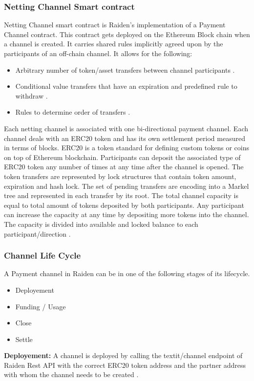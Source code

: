 \subsubsection{Netting Channel Smart contract} \label{NCSC}	
Netting Channel smart contract is Raiden’s implementation of a Payment Channel contract. This contract gets deployed on the Ethereum Block chain when a channel is created. It carries shared rules implicitly agreed upon by the participants of an off-chain channel. It allows for the following: \cite{rad:001}
\begin{itemize}

\item Arbitrary number of token/asset transfers between channel participants \cite{rad:001}.
\item Conditional value transfers that have an expiration and predefined rule to withdraw \cite{rad:001}.
\item Rules to determine order of transfers \cite{rad:001}.

\end{itemize}
Each netting channel is associated with one bi-directional payment channel. Each channel deals with an ERC20 token and has its own settlement period measured in terms of blocks. ERC20 is a token standard for defining custom tokens or coins on top of Ethereum blockchain. Participants can deposit the associated type of ERC20 token any number of times at any time after the channel is opened. The token transfers are represented by lock structures that contain token amount, expiration and hash lock. The set of pending transfers are encoding into a Markel tree and represented in each transfer by its root. The total channel capacity is equal to total amount of tokens deposited by both participants. Any participant can increase the capacity at any time by depositing more tokens into the channel. The capacity is divided into available and locked balance to each participant/direction \cite{rad:001}.
\clearpage
\subsubsection{Channel Life Cycle} \label{CLC}	
A Payment channel in Raiden can be in one of the following stages of its lifecycle.
\begin{itemize}

\item Deployement
\item Funding / Usage
\item Close
\item Settle
\end{itemize}
\textbf{Deployement:} A channel is deployed by calling the textit{/channel} endpoint of Raiden Rest API with the correct ERC20 token address and the partner address with whom the channel needs to be created \cite{rad:001}.

